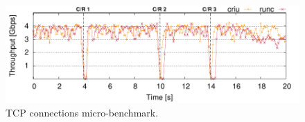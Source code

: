 \documentclass[9pt,    %
    english,            %
    xcolor=table,       %
    envcountsect,        %
    aspectratio=169     %
]{beamer}
\begin{document}
\begin{frame}
\begin{columns}
\begin{column}{.5\textwidth}
\begin{figure}
                \includegraphics[width=\textwidth]{./figs/tcp_established_resolution_microbenchmark.pdf}
                \caption{TCP connections micro-benchmark.\label{fig:tcp-microbecnhmark}}
            \end{figure}
        \end{column}
    \end{columns}
    
\end{frame}
\end{document}
